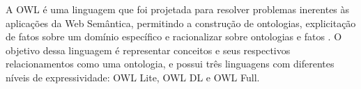 A OWL é uma linguagem que foi projetada para resolver problemas inerentes às aplicações
da Web Semântica, permitindo a construção de ontologias, explicitação de fatos sobre um
domínio específico e racionalizar sobre ontologias e fatos \cite{breitman05}. O objetivo
dessa linguagem é representar conceitos e seus respectivos relacionamentos como uma
ontologia, e possui três linguagens com diferentes níveis de expressividade: OWL Lite, OWL
DL e OWL Full.